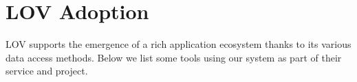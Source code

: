 \documentclass{iosart2c}
\begin{document}
\begin{description}
		
%							
%   
   
\end{description}


\section{LOV Adoption}
\label{sec:lovecosystem}
LOV supports the emergence of a rich application ecosystem thanks to its various data access methods. Below we list some tools using our system as part of their service and project.
 
\end{document}
